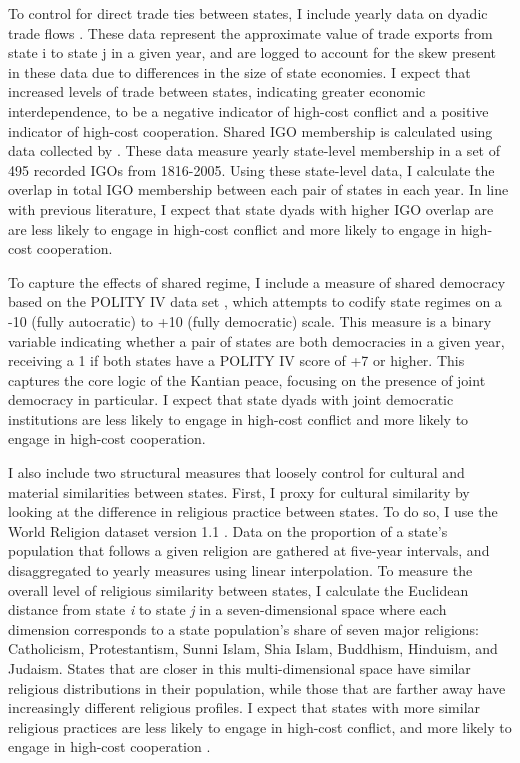 \documentclass[10pt,]{article}
\begin{document}
To control for direct trade ties between states, I include yearly data
on dyadic trade flows \citep[version 3.0]{Barbieri2009}. These data
represent the approximate value of trade exports from state i to state j
in a given year, and are logged to account for the skew present in these
data due to differences in the size of state economies. I expect that
increased levels of trade between states, indicating greater economic
interdependence, to be a negative indicator of high-cost conflict and a
positive indicator of high-cost cooperation. Shared IGO membership is
calculated using data collected by \citet{Pevehouse2002}. These data
measure yearly state-level membership in a set of 495 recorded IGOs from
1816-2005. Using these state-level data, I calculate the overlap in
total IGO membership between each pair of states in each year. In line
with previous literature, I expect that state dyads with higher IGO
overlap are are less likely to engage in high-cost conflict and more
likely to engage in high-cost cooperation.

To capture the effects of shared regime, I include a measure of shared
democracy based on the POLITY IV data set \citep{Marshall2015}, which
attempts to codify state regimes on a -10 (fully autocratic) to +10
(fully democratic) scale. This measure is a binary variable indicating
whether a pair of states are both democracies in a given year, receiving
a 1 if both states have a POLITY IV score of +7 or higher. This captures
the core logic of the Kantian peace, focusing on the presence of joint
democracy in particular. I expect that state dyads with joint democratic
institutions are less likely to engage in high-cost conflict and more
likely to engage in high-cost cooperation.

I also include two structural measures that loosely control for cultural
and material similarities between states. First, I proxy for cultural
similarity by looking at the difference in religious practice between
states. To do so, I use the World Religion dataset version 1.1
\citep{Maoz2013}. Data on the proportion of a state's population that
follows a given religion are gathered at five-year intervals, and
disaggregated to yearly measures using linear interpolation. To measure
the overall level of religious similarity between states, I calculate
the Euclidean distance from state \emph{i} to state \emph{j} in a
seven-dimensional space where each dimension corresponds to a state
population's share of seven major religions: Catholicism, Protestantism,
Sunni Islam, Shia Islam, Buddhism, Hinduism, and Judaism. States that
are closer in this multi-dimensional space have similar religious
distributions in their population, while those that are farther away
have increasingly different religious profiles. I expect that states
with more similar religious practices are less likely to engage in
high-cost conflict, and more likely to engage in high-cost cooperation
\citep{Corbetta2013}.
\end{document}
